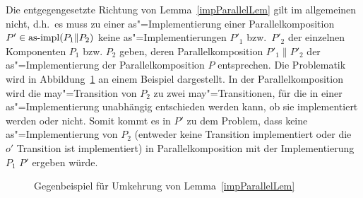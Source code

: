 Die entgegengesetzte Richtung von Lemma~\ref{impParallelLem} gilt im
allgemeinen nicht, d.h.\ es muss zu einer as"=Implementierung einer
Parallelkomposition $P'\in\mathrm{as}\text{-}\mathrm{impl} (P_1\|P_2)$ keine as"=Implementierungen $P'_1$
bzw.\ $P'_2$ der einzelnen Komponenten $P_1$ bzw. $P_2$ geben, deren
Parallelkomposition $P'_1\|P'_2$ der as"=Implementierung der
Parallelkomposition $P$ entsprechen. Die Problematik wird
in Abbildung~\ref{impParallelFig} an einem Beispiel dargestellt. In der
Parallelkomposition wird die may"=Transition von $P_2$ zu zwei
may"=Transitionen, für die in einer as"=Implementierung unabhängig
entschieden werden kann, ob sie implementiert werden oder nicht. Somit kommt es
in $P'$ zu dem Problem, dass keine as"=Implementierung von $P_2$ (entweder
keine Transition implementiert oder die $o'$ Transition ist implementiert) in
Parallelkomposition mit der Implementierung $P_1$ $P'$ ergeben würde.


\begin{figure}[htbp]
  \begin{center}
    \caption{Gegenbeispiel für Umkehrung von Lemma~\ref{impParallelLem}}
    \label{impParallelFig}
  \end{center}
\end{figure}

